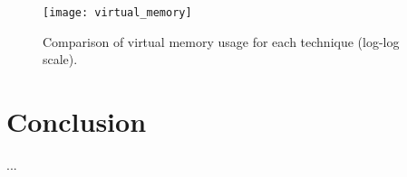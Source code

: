\documentclass[acmtocl,acmnow]{acmtrans2m}
\begin{document}
\begin{figure}
	\begin{center}
		\texttt{[image: virtual\_memory]}
	\end{center}
	\caption{Comparison of virtual memory usage for each technique (log-log scale).}
	\label{fig-virtual-memory}
\end{figure}


\section{Conclusion}








\begin{received}
...
\end{received}
\end{document}
